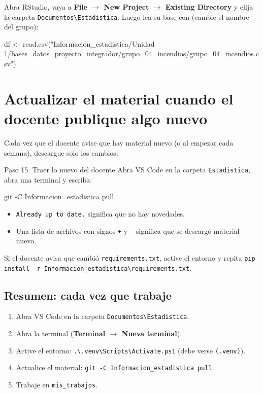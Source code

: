 \documentclass[11pt,a4paper]{article}
\newenvironment{terminal}{\begin{tcolorbox}[terminal]}{\end{tcolorbox}}
\newcommand{\cmd}[1]{\texttt{\textcolor{petroleo}{#1}}}
\begin{document}
\begin{nota}[title=Si trabaja en R / RStudio]
Abra RStudio, vaya a \textbf{File $\rightarrow$ New Project $\rightarrow$ Existing Directory} y elija la carpeta \texttt{Documentos\textbackslash Estadistica}. Luego lea su base con (cambie el nombre del grupo):
\begin{terminal}
\begin{comando}
df <- read.csv("Informacion_estadistica/Unidad 1/bases_datos_proyecto_integrador/grupo_04_incendios/grupo_04_incendios.csv")
\end{comando}
\end{terminal}
\end{nota}

\section{Actualizar el material cuando el docente publique algo nuevo}

Cada vez que el docente avise que hay material nuevo (o al empezar cada semana), descargue solo los cambios:

\begin{paso}{Paso 15. Traer lo nuevo del docente}
Abra VS Code en la carpeta \texttt{Estadistica}, abra una terminal y escriba:
\begin{terminal}
\begin{comando}
git -C Informacion_estadistica pull
\end{comando}
\end{terminal}
\begin{itemize}[leftmargin=*]
  \item \texttt{Already up to date.} significa que no hay novedades.
  \item Una lista de archivos con signos \texttt{+} y \texttt{-} significa que se descargó material nuevo.
\end{itemize}
Si el docente avisa que cambió \texttt{requirements.txt}, active el entorno y repita \cmd{pip install -r Informacion\_estadistica\textbackslash requirements.txt}.
\end{paso}

\subsection{Resumen: cada vez que trabaje}

\begin{enumerate}
  \item Abra VS Code en la carpeta \texttt{Documentos\textbackslash Estadistica}.
  \item Abra la terminal (\textbf{Terminal $\rightarrow$ Nueva terminal}).
  \item Active el entorno: \cmd{.\textbackslash .venv\textbackslash Scripts\textbackslash Activate.ps1} (debe verse \texttt{(.venv)}).
  \item Actualice el material: \cmd{git -C Informacion\_estadistica pull}.
  \item Trabaje en \texttt{mis\_trabajos}.
\end{enumerate}
\end{document}
